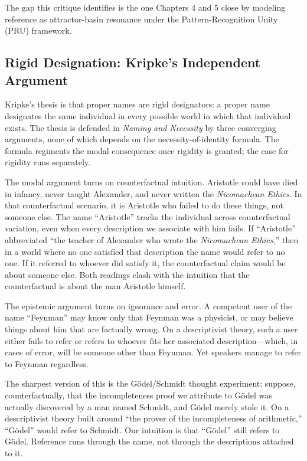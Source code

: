 \documentclass[12pt,a4paper]{article}
\begin{document}
The gap this critique identifies is the one Chapters 4 and 5 close by modeling reference as attractor-basin resonance under the Pattern-Recognition Unity (PRU) framework.

\subsection{Rigid Designation: Kripke's Independent Argument}\label{rigid-designation-kripkes-independent-argument}

Kripke's thesis is that proper names are rigid designators: a proper name designates the same individual in every possible world in which that individual exists. The thesis is defended in \emph{Naming and Necessity} by three converging arguments, none of which depends on the necessity-of-identity formula. The formula regiments the modal consequence once rigidity is granted; the case for rigidity runs separately.

The modal argument turns on counterfactual intuition. Aristotle could have died in infancy, never taught Alexander, and never written the \emph{Nicomachean Ethics}. In that counterfactual scenario, it is Aristotle who failed to do these things, not someone else. The name ``Aristotle'' tracks the individual across counterfactual variation, even when every description we associate with him fails. If ``Aristotle'' abbreviated ``the teacher of Alexander who wrote the \emph{Nicomachean Ethics},'' then in a world where no one satisfied that description the name would refer to no one. If it referred to whoever did satisfy it, the counterfactual claim would be about someone else. Both readings clash with the intuition that the counterfactual is about the man Aristotle himself.

The epistemic argument turns on ignorance and error. A competent user of the name ``Feynman'' may know only that Feynman was a physicist, or may believe things about him that are factually wrong. On a descriptivist theory, such a user either fails to refer or refers to whoever fits her associated description---which, in cases of error, will be someone other than Feynman. Yet speakers manage to refer to Feynman regardless.

The sharpest version of this is the Gödel/Schmidt thought experiment: suppose, counterfactually, that the incompleteness proof we attribute to Gödel was actually discovered by a man named Schmidt, and Gödel merely stole it. On a descriptivist theory built around ``the prover of the incompleteness of arithmetic,'' ``Gödel'' would refer to Schmidt. Our intuition is that ``Gödel'' still refers to Gödel. Reference runs through the name, not through the descriptions attached to it.
\end{document}
